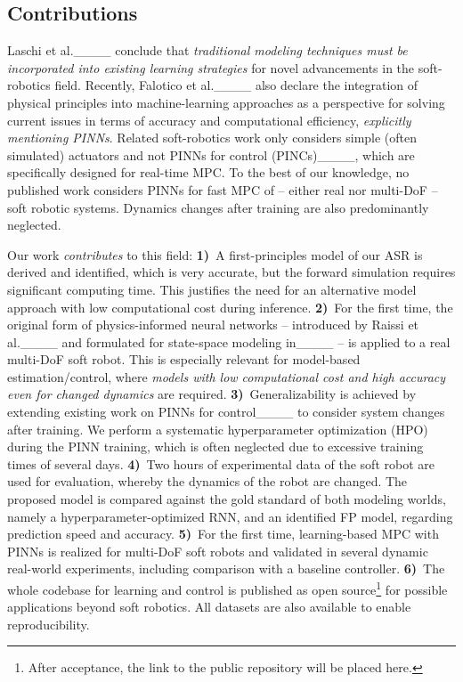\subsection{Contributions}
Laschi et al.____ conclude that\textit{ traditional modeling techniques must be incorporated into existing learning strategies} for novel advancements in the soft-robotics field.
Recently, Falotico et al.____ also declare the integration of physical principles into machine-learning approaches as a perspective for solving current issues in terms of accuracy and computational efficiency, \textit{explicitly mentioning PINNs}.  
Related soft-robotics work only considers simple (often simulated) actuators and not PINNs for control (PINCs)____, which are specifically designed for real-time MPC.
To the best of our knowledge, no published work considers PINNs for fast MPC of -- either real nor multi-DoF -- soft robotic systems.
Dynamics changes after training are also predominantly neglected.

Our work \textit{contributes} to this field: 
\textbf{1)}~A first-principles model of our ASR is derived and identified, which is very accurate, but the forward simulation requires significant computing time. 
This justifies the need for an alternative model approach with low computational cost during inference.
\textbf{2)}~For the first time, the original form of physics-informed neural networks -- introduced by Raissi et al.____ and formulated for state-space modeling in____ -- is applied to a real multi-DoF soft robot.
This is especially relevant for model-based estimation/control, where \textit{models with low computational cost and high accuracy even for changed dynamics} are required.
\textbf{3)}~Generalizability is achieved by extending existing work on PINNs for control____ to consider system changes after training.
We perform a systematic hyperparameter optimization (HPO) during the PINN training, which is often neglected due to excessive training times of several days.
\textbf{4)}~Two hours of experimental data of the soft robot are used for evaluation, whereby the dynamics of the robot are changed. 
The proposed model is compared against the gold standard of both modeling worlds, namely a hyperparameter-optimized RNN, and an identified FP model, regarding prediction speed and accuracy.
\textbf{5)}~For the first time, learning-based MPC with PINNs is realized for multi-DoF soft robots and validated in several dynamic real-world experiments, including comparison with a baseline controller.
\textbf{6)}~The whole codebase for learning and control is published as open source\footnote{\label{foot:pinn}After acceptance, the link to the public repository will be placed here.} for possible applications beyond soft robotics. 
All datasets are also available to enable reproducibility.

